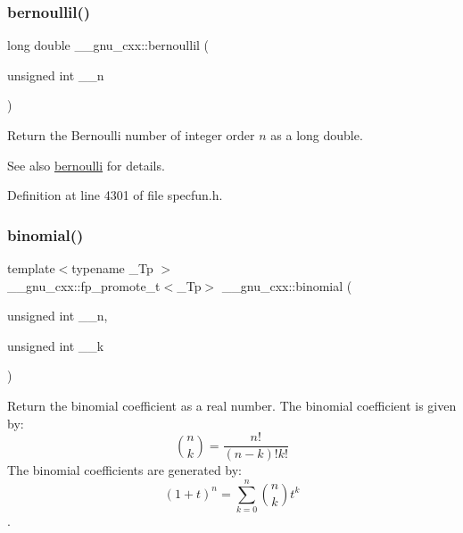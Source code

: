 \subsubsection{\texorpdfstring{bernoullil()}{bernoullil()}}
{\footnotesize\ttfamily long double \+\_\+\+\_\+gnu\+\_\+cxx\+::bernoullil (\begin{DoxyParamCaption}\item[{unsigned int}]{\+\_\+\+\_\+n }\end{DoxyParamCaption})\hspace{0.3cm}{\ttfamily [inline]}}

Return the Bernoulli number of integer order $ n $ as a {\ttfamily long double}.

\begin{DoxySeeAlso}{See also}
\hyperlink{group__gnu__math__spec__func_gad339f0011df1967ec6c9e55bd1547bf4}{bernoulli} for details. 
\end{DoxySeeAlso}


Definition at line 4301 of file specfun.\+h.

\mbox{\label{group__gnu__math__spec__func_gabd0cf6e3f1e1d36c4c45f118e34a5ca2}} 
\subsubsection{\texorpdfstring{binomial()}{binomial()}}
{\footnotesize\ttfamily template$<$typename \+\_\+\+Tp $>$ \\
\+\_\+\+\_\+gnu\+\_\+cxx\+::fp\+\_\+promote\+\_\+t$<$\+\_\+\+Tp$>$ \+\_\+\+\_\+gnu\+\_\+cxx\+::binomial (\begin{DoxyParamCaption}\item[{unsigned int}]{\+\_\+\+\_\+n,  }\item[{unsigned int}]{\+\_\+\+\_\+k }\end{DoxyParamCaption})\hspace{0.3cm}{\ttfamily [inline]}}



Return the binomial coefficient as a real number. The binomial coefficient is given by\+: \[ \binom{n}{k} = \frac{n!}{(n-k)! k!} \] The binomial coefficients are generated by\+: \[ \left(1 + t\right)^n = \sum_{k=0}^n \binom{n}{k} t^k \]. 


